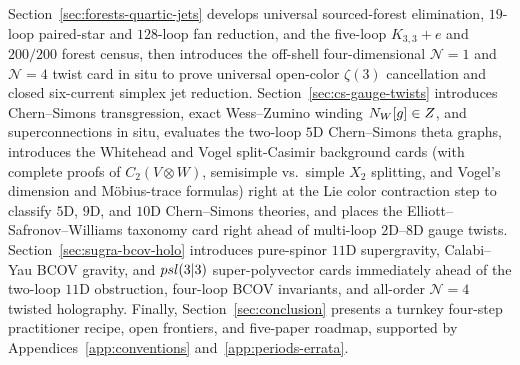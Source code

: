 Section~\ref{sec:forests-quartic-jets} develops universal sourced-forest elimination, $19$-loop paired-star and $128$-loop fan reduction, and the five-loop $K_{3,3}+e$ and $200/200$ forest census, then introduces the off-shell four-dimensional $\mathcal{N}=1$ and $\mathcal{N}=4$ twist card in situ to prove universal open-color $\zeta(3)$ cancellation and closed six-current simplex jet reduction. Section~\ref{sec:cs-gauge-twists} introduces Chern--Simons transgression, exact Wess--Zumino winding $N_W[g]\in Z$, and superconnections in situ, evaluates the two-loop $5\mathrm{D}$ Chern--Simons theta graphs, introduces the Whitehead and Vogel split-Casimir background cards (with complete proofs of $C_2(V\otimes W)$, semisimple vs.\ simple $X_2$ splitting, and Vogel's dimension and Möbius-trace formulas) right at the Lie color contraction step to classify $5\mathrm{D}$, $9\mathrm{D}$, and $10\mathrm{D}$ Chern--Simons theories, and places the Elliott--Safronov--Williams taxonomy card right ahead of multi-loop $2\mathrm{D}$--$8\mathrm{D}$ gauge twists. Section~\ref{sec:sugra-bcov-holo} introduces pure-spinor $11\mathrm{D}$ supergravity, Calabi--Yau BCOV gravity, and $psl(3|3)$ super-polyvector cards immediately ahead of the two-loop $11\mathrm{D}$ obstruction, four-loop BCOV invariants, and all-order $\mathcal{N}=4$ twisted holography. Finally, Section~\ref{sec:conclusion} presents a turnkey four-step practitioner recipe, open frontiers, and five-paper roadmap, supported by Appendices~\ref{app:conventions} and~\ref{app:periods-errata}.
